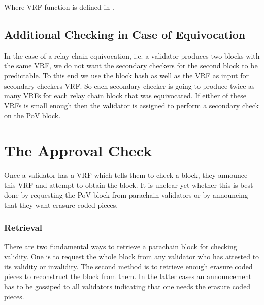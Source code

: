 Where {\sc VRF} function is defined in \cite{polkadot-crypto-spec}.

\subsection{Additional Checking in Case of Equivocation}\label{sect-equivocation-case}
In the case of a relay chain equivocation, i.e. a validator produces two blocks with the same VRF, we do not want the secondary checkers for the second block to be predictable. To this end we use the block hash as well as the VRF as input for secondary checkers VRF. So each secondary checker is going to produce twice as many VRFs for each relay chain block that was equivocated. If either of these VRFs is small enough then the validator is assigned to perform a secondary check on the PoV block.

\section{The Approval Check}
\label{sect-approval-checking}
Once a validator has a VRF which tells them to check a block, they announce this VRF and attempt to obtain the block. 
It is unclear yet whether this is best done by requesting the PoV block from parachain validators or by announcing that they want erasure coded pieces. 

\subsubsection{Retrieval}
\label{sect-retrieval-of-erasure-pieces}
There are two fundamental ways to retrieve a parachain block for checking validity. One is to request the whole block from any validator who has attested to its validity or invalidity. The second method is to retrieve enough erasure coded pieces to reconstruct the block from them. In the latter cases an announcement has to be gossiped to all validators indicating that one needs the erasure coded pieces.



